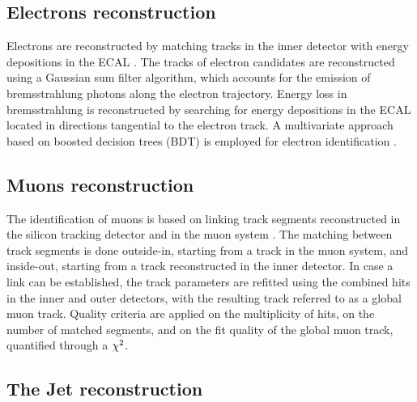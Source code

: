 \subsection{Electrons reconstruction}


Electrons are reconstructed by matching tracks in the inner detector with energy depositions in the ECAL \cite{CMS:2009nxa,Baffioni2007}. The tracks of electron candidates are reconstructed using a Gaussian sum ﬁlter \cite{Adam:2005bya} algorithm, which accounts for the emission of bremsstrahlung photons along the electron trajectory. Energy loss in bremsstrahlung is reconstructed by searching for energy depositions in the ECAL located in directions tangential to the electron track. A multivariate approach based on boosted decision trees (BDT) \cite{Hocker:2007ht} is employed for electron identification \cite{1748-0221-10-06-P06005}.

\subsection{Muons reconstruction}

 The identification of muons is based on linking track segments reconstructed in the silicon tracking detector and in the muon system \cite{Chatrchyan:2012xi}. The matching between track segments is done outside-in, starting from a track in the muon system, and inside-out, starting from a track reconstructed in the inner detector. In case a link can be established, the track parameters are refitted using the combined hits in the inner and outer detectors, with the resulting track referred to as a global muon track. Quality criteria are applied on the multiplicity of hits, on the number of matched segments, and on the ﬁt quality of the global muon track, quantified through a \ensuremath{\chisquare}.


\subsection {The Jet reconstruction}

